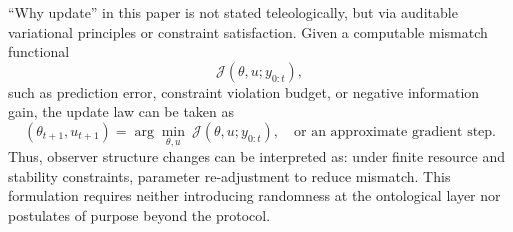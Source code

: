 ``Why update'' in this paper is not stated teleologically, but via auditable variational principles or constraint satisfaction. Given a computable mismatch functional
\[
\mathcal{J}(\theta,u; y_{0:t}) ,
\]
such as prediction error, constraint violation budget, or negative information gain, the update law can be taken as
\[
(\theta_{t+1},u_{t+1})
=
\arg\min_{\theta,u}\ \mathcal{J}(\theta,u; y_{0:t}),
\quad \text{or an approximate gradient step.}
\]
Thus, observer structure changes can be interpreted as: under finite resource and stability constraints, parameter re-adjustment to reduce mismatch. This formulation requires neither introducing randomness at the ontological layer nor postulates of purpose beyond the protocol.
